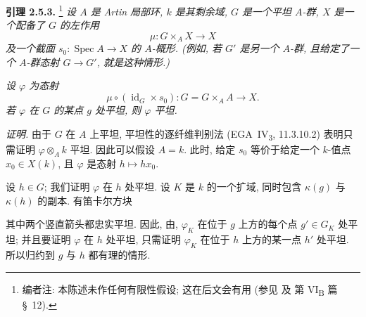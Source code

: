 
\setcounter{footnote}{29}
\medskip
{}\label{lem:sga3-VIA-2.5.3}%
\noindent\textbf{引理 2.5.3.}%
\footnote{\label{note:sga3-VIA-30}编者注: 本陈述未作任何有限性假设;
这在后文会有用 (参见  及
第 VI\textsubscript{B} 篇 \S~12).}
\textit{设 \(A\) 是 Artin 局部环, \(k\) 是其剩余域,
\(G\) 是一个平坦 \(A\)-群,
\(X\) 是一个配备了 \(G\) 的左作用
\[
  \mu:G\times_AX\longrightarrow X
\]
及一个截面 \(s_0:\operatorname{Spec}A\to X\) 的 \(A\)-概形.
(例如, 若 \(G'\) 是另一个 \(A\)-群,
且给定了一个 \(A\)-群态射 \(G\to G'\), 就是这种情形.)}

\textit{设 \(\varphi\) 为态射
\[
  \mu\circ(\operatorname{id}_G\times s_0):
  G=G\times_AA\longrightarrow X.
\]
若 \(\varphi\) 在 \(G\) 的某点 \(g\) 处平坦,
则 \(\varphi\) 平坦.}

\noindent\textit{证明.}
由于 \(G\) 在 \(A\) 上平坦,
平坦性的逐纤维判别法 (EGA~IV\textsubscript{3}, 11.3.10.2)
表明只需证明 \(\varphi\otimes_Ak\) 平坦.
因此可以假设 \(A=k\).
此时, 给定 \(s_0\) 等价于给定一个 \(k\)-值点 \(x_0\in X(k)\),
且 \(\varphi\) 是态射 \(h\mapsto hx_0\).

设 \(h\in G\); 我们证明 \(\varphi\) 在 \(h\) 处平坦.
设 \(K\) 是 \(k\) 的一个扩域,
同时包含 \(\kappa(g)\) 与 \(\kappa(h)\) 的副本.
有笛卡尔方块
\begin{center}
  \label{diag:sga3-VIA-2.5.3-basechange}%
\end{center}
其中两个竖直箭头都忠实平坦.
因此, 由,
\(\varphi_K\) 在位于 \(g\) 上方的每个点 \(g'\in G_K\) 处平坦;
并且要证明 \(\varphi\) 在 \(h\) 处平坦,
只需证明 \(\varphi_K\) 在位于 \(h\) 上方的某一点 \(h'\) 处平坦.
所以归约到 \(g\) 与 \(h\) 都有理的情形.

